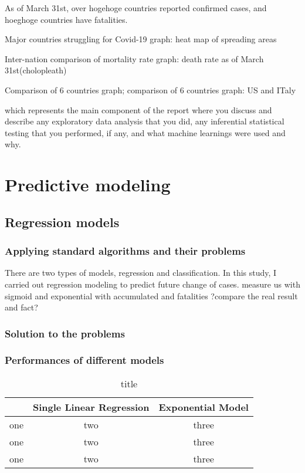 \documentclass{article}
\begin{document}
As of March 31st, over hogehoge countries reported confirmed cases, and hoeghoge countries have fatalities. 

Major countries struggling for Covid-19
graph: heat map of spreading areas

Inter-nation comparison of mortality rate
graph: death rate as of March 31st(cholopleath)

Comparison of 6 countries
graph; comparison of 6 countries
graph: US and ITaly

which represents the main component of the report where you discuss and describe any exploratory data analysis that you did, any inferential statistical testing that you performed, if any, and what machine learnings were used and why.

\section{Predictive modeling}
\subsection{Regression models}
\subsubsection{Applying standard algorithms and their problems}
There are two types of models, regression and classification. In this study, I carried out regression modeling to predict future change of cases.
measure us with sigmoid and exponential
with accumulated and fatalities
?compare the real result and fact?
\subsubsection{Solution to the problems}
\subsubsection{Performances of different models}

\begin{table}[htb]
  \begin{center}
    \caption{title}
    \begin{tabular}{|c|c|c|} \hline
        & Single Linear Regression & Exponential Model\\ \hline
      one & two & three \\
      one & two& three \\
      one & two & three\\ \hline
    \end{tabular}
  \end{center}
\end{table}
\end{document}
